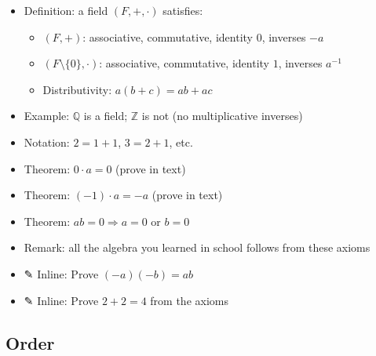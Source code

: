 \documentclass[
  10pt,
  letterpaper,
]{scrbook}
\providecommand{\tightlist}{%
  \setlength{\itemsep}{0pt}\setlength{\parskip}{0pt}}
\newcommand{\ZZ}{\mathbb{Z}}
\newcommand{\QQ}{\mathbb{Q}}
\begin{document}
\begin{itemize}
\tightlist
\item
  Definition: a field \((F, +, \cdot)\) satisfies:

  \begin{itemize}
  \tightlist
  \item
    \((F, +)\): associative, commutative, identity \(0\), inverses
    \(-a\)
  \item
    \((F \setminus \{0\}, \cdot)\): associative, commutative, identity
    \(1\), inverses \(a^{-1}\)
  \item
    Distributivity: \(a(b + c) = ab + ac\)
  \end{itemize}
\item
  Example: \(\QQ\) is a field; \(\ZZ\) is not (no multiplicative
  inverses)
\item
  Notation: \(2 = 1 + 1\), \(3 = 2 + 1\), etc.
\item
  Theorem: \(0 \cdot a = 0\) (prove in text)
\item
  Theorem: \((-1) \cdot a = -a\) (prove in text)
\item
  Theorem: \(ab = 0 \Rightarrow a = 0\) or \(b = 0\)
\item
  Remark: all the algebra you learned in school follows from these
  axioms
\item
  ✎ Inline: Prove \((-a)(-b) = ab\)
\item
  ✎ Inline: Prove \(2 + 2 = 4\) from the axioms
\end{itemize}

\subsection{Order}\label{order}
\end{document}
